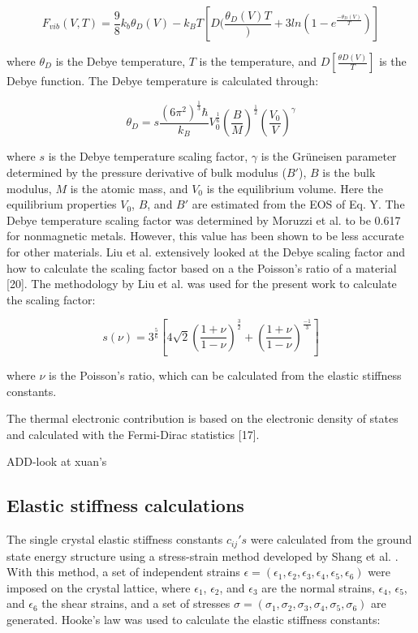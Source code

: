 \begin{equation}
\label{eq: debye}
F_{vib}(V,T) = \frac{9}{8} k_{b} \theta_{D}(V) - k_{B}T[D (\frac{\theta_D(V){T}}) + 3ln(1-e^{\frac{-\theta_{D}(V)}{T}})] 
\end{equation}

where $\theta_{D}$ is the Debye temperature, $T$ is the temperature, and $D[\frac{\theta{D}(V)}{T}]$ is the Debye function. The Debye temperature is calculated through: 

\begin{equation}
\label{eq: debyetemp}
\theta_{D} = s \frac{(6\pi^2)^{\frac{1}{3}}\hbar}{k_B} V_{0}^{\frac{1}{6}} (\frac{B}{M})^{\frac{1}{2}} (\frac{V_0}{V})^{\gamma} 
\end{equation}

where $s$ is the Debye temperature scaling factor, $\gamma$ is the Grüneisen parameter determined by the pressure derivative of bulk modulus ($B'$), $B$ is the bulk modulus, $M$ is the atomic mass, and $V_0$ is the equilibrium volume. Here the equilibrium properties $V_0$, $B$, and $B'$ are estimated from the EOS of Eq. Y. The Debye temperature scaling factor was determined by Moruzzi et al. \cite{Moruzzi1988} to be 0.617 for nonmagnetic metals. However, this value has been shown to be less accurate for other materials. Liu et al. extensively looked at the Debye scaling factor and how to calculate the scaling factor based on a the Poisson’s ratio of a material [20]. The methodology by Liu et al. \cite{Liu2015} was used for the present work to calculate the scaling factor: 

\begin{equation}
\label{eq: debyescaling}
s(\nu) = 3^{\frac{5}{6}} [4\sqrt{2} (\frac{1 + \nu}{1 - \nu})^{\frac{3}{2}} + (\frac{1 + \nu}{1 - \nu})^{\frac{-1}{3}}]
\end{equation}

where $\nu$ is the Poisson’s ratio, which can be calculated from the elastic stiffness constants.

The thermal electronic contribution is based on the electronic density of states and calculated with the Fermi-Dirac statistics [17].


ADD-look at xuan's

\subsection{Elastic stiffness calculations}

The single crystal elastic stiffness constants $c_{ij}'s$ were calculated from the ground state energy structure using a stress-strain method developed by Shang et al. \cite{Shang2007c}. With this method, a set of independent strains $\epsilon = (\epsilon_{1}, \epsilon_{2}, \epsilon_{3}, \epsilon_{4}, \epsilon_{5}, \epsilon_{6})$  were imposed on the crystal lattice, where $\epsilon_{1}$, $\epsilon_{2}$, and $\epsilon_{3}$ are the normal strains, $\epsilon_{4}$, $\epsilon_{5}$, and $\epsilon_{6}$ the shear strains, and a set of stresses $\sigma = (\sigma_{1}, \sigma_{2}, \sigma_{3}, \sigma_{4}, \sigma_{5},\sigma_{6})$ are generated. Hooke's law was used to calculate the elastic stiffness constants: 

